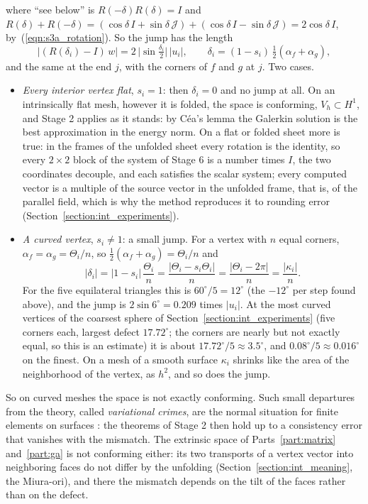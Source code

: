 where ``see below'' is $R(-\delta)R(\delta) = I$ and $R(\delta) + R(-\delta) = (\cos\delta\, I + \sin\delta\,\mathcal J) + (\cos\delta\, I - \sin\delta\,\mathcal J) = 2\cos\delta\, I$, by~(\ref{eqn:s3a_rotation}). So the jump has the length
\begin{equation}
\label{eqn:r3_jump}
\big|(R(\delta_i) - I)\,w\big| = 2\,\big|\sin\tfrac{\delta_i}{2}\big|\, |u_i|, \qquad \delta_i = (1 - s_i)\,\tfrac12(\alpha_f + \alpha_g),
\end{equation}
and the same at the end $j$, with the corners of $f$ and $g$ at $j$. Two cases.
\begin{itemize}
\item \emph{Every interior vertex flat}, $s_i = 1$: then $\delta_i = 0$ and no jump at all. On an intrinsically flat mesh, however it is folded, the space is conforming, $V_h \subset H^1$, and Stage 2 applies as it stands: by C\'ea's lemma the Galerkin solution is the best approximation in the energy norm. On a flat or folded sheet more is true: in the frames of the unfolded sheet every rotation is the identity, so every $2\times 2$ block of the system of Stage 6 is a number times $I$, the two coordinates decouple, and each satisfies the scalar system; every computed vector is a multiple of the source vector in the unfolded frame, that is, of the parallel field, which is why the method reproduces it to rounding error (Section~\ref{section:int_experiments}).
\item \emph{A curved vertex}, $s_i \ne 1$: a small jump. For a vertex with $n$ equal corners, $\alpha_f = \alpha_g = \Theta_i/n$, so $\frac12(\alpha_f + \alpha_g) = \Theta_i/n$ and
\begin{equation*}
|\delta_i| = |1 - s_i|\,\frac{\Theta_i}{n} = \frac{|\Theta_i - s_i\Theta_i|}{n} = \frac{|\Theta_i - 2\pi|}{n} = \frac{|\kappa_i|}{n} .
\end{equation*}
For the five equilateral triangles this is $60^\circ/5 = 12^\circ$ (the $-12^\circ$ per step found above), and the jump is $2\sin 6^\circ = 0.209$ times $|u_i|$. At the most curved vertices of the coarsest sphere of Section~\ref{section:int_experiments} (five corners each, largest defect $17.72^\circ$; the corners are nearly but not exactly equal, so this is an estimate) it is about $17.72^\circ/5 \approx 3.5^\circ$, and $0.08^\circ/5 \approx 0.016^\circ$ on the finest. On a mesh of a smooth surface $\kappa_i$ shrinks like the area of the neighborhood of the vertex, as $h^2$, and so does the jump.
\end{itemize}
So on curved meshes the space is not exactly conforming. Such small departures from the theory, called \emph{variational crimes}, are the normal situation for finite elements on surfaces \cite{DziukElliott2013, Hansbo2020}: the theorems of Stage 2 then hold up to a consistency error that vanishes with the mismatch. The extrinsic space of Parts~\ref{part:matrix} and~\ref{part:ga} is not conforming either: its two transports of a vertex vector into neighboring faces do not differ by the unfolding (Section~\ref{section:int_meaning}, the Miura-ori), and there the mismatch depends on the tilt of the faces rather than on the defect.

